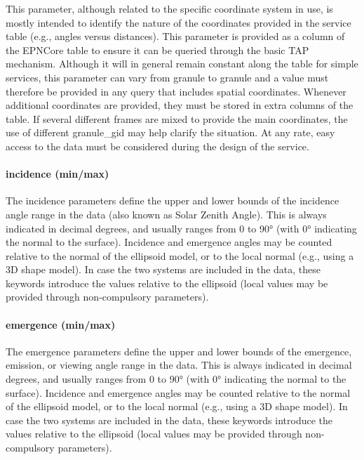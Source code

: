 \documentclass[11pt,a4paper]{ivoa}
\begin{document}
This parameter, although related to the specific coordinate system in use,
is mostly intended to identify the nature of the coordinates provided in
the service table (e.g., angles versus distances). This parameter is
provided as a column of the EPNCore table to ensure it can be queried
through the basic TAP mechanism. Although it will in general remain
constant along the table for simple services, this parameter can vary from
granule to granule and a value must therefore be provided in any query
that includes spatial coordinates. Whenever additional coordinates are
provided, they must be stored in extra columns of the table. If several
different frames are mixed to provide the main coordinates, the use of
different granule\_gid may help clarify the situation. At any rate, easy
access to the data must be considered during the design of the service.

\paragraph{incidence (min/max)}

The incidence parameters define the upper and lower bounds of the
incidence angle range in the data (also known as Solar Zenith Angle).
This is always indicated in decimal degrees, and usually ranges from 0 to
90° (with 0° indicating the normal to the surface). Incidence and
emergence angles may be counted relative to the normal of the ellipsoid
model, or to the local normal (e.g., using a 3D shape model). In case
the two systems are included in the data, these keywords introduce the
values relative to the ellipsoid (local values may be provided through
non-compulsory parameters).

\paragraph{emergence (min/max)}

The emergence parameters define the upper and lower bounds of the
emergence, emission, or viewing angle range in the data. This is always
indicated in decimal degrees, and usually ranges from 0 to 90° (with
0° indicating the normal to the surface). Incidence and emergence angles
may be counted relative to the normal of the ellipsoid model, or to the
local normal (e.g., using a 3D shape model). In case the two systems
are included in the data, these keywords introduce the values relative
to the ellipsoid (local values may be provided through non-compulsory
parameters).
\end{document}
